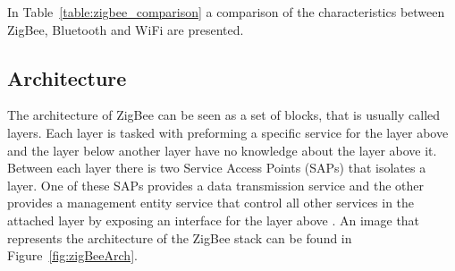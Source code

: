In Table~\ref{table:zigbee_comparison} a comparison of the characteristics between ZigBee, Bluetooth and WiFi are presented.

\begin{table}[H]
\centering
{}
\caption{ZigBee, Bluetooth, and WiFi comparison \citep{yang2014internet, zigbee_alliance_2019}}
\label{table:zigbee_comparison}
\end{table}

\subsection{Architecture}\label{sec:architecture}
The architecture of ZigBee can be seen as a set of blocks, that is usually called layers. Each layer is tasked with preforming a specific service for the layer above and the layer below another layer have no knowledge about the layer above it. Between each layer there is two Service Access Points (SAPs) that isolates a layer. One of these SAPs provides a data transmission service and the other provides a management entity service that control all other services in the attached layer by exposing an interface for the layer above \citep{gislason2008zigbee, zigbee2007spec}. An image that represents the architecture of the ZigBee stack can be found in Figure~\ref{fig:zigBeeArch}.

